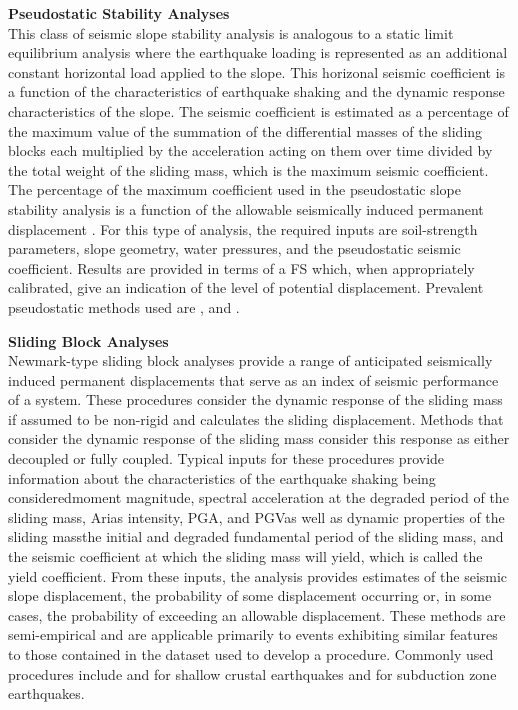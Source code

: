 \noindent\textbf{Pseudostatic Stability Analyses} \\
This class of seismic slope stability analysis is analogous to a static limit equilibrium analysis where the earthquake loading is represented as an additional constant horizontal load applied to the slope. This horizonal seismic coefficient is a function of the characteristics of earthquake shaking and the dynamic response characteristics of the slope. The seismic coefficient is estimated as a percentage of the maximum value of the summation of the differential masses of the sliding blocks each multiplied by the acceleration acting on them over time divided by the total weight of the sliding mass, which is the maximum seismic coefficient. The percentage of the maximum coefficient used in the pseudostatic slope stability analysis is a function of the allowable seismically induced permanent displacement \citep{bray2009pseudostatic}. For this type of analysis, the required inputs are soil-strength parameters, slope geometry, water pressures, and the pseudostatic seismic coefficient. Results are provided in terms of a FS which, when appropriately calibrated, give an indication of the level of potential displacement. Prevalent pseudostatic methods used are \cite{seed1979considerations, hynes1984rationalizing, bray2009pseudostatic, macedo2018performance}, and \cite{bray2019procedure}.
\newline

\noindent\textbf{Sliding Block Analyses} \\
Newmark-type sliding block analyses provide a range of anticipated seismically induced permanent displacements that serve as an index of seismic performance of a system. These procedures consider the dynamic response of the sliding mass if assumed to be non-rigid and calculates the sliding displacement. Methods that consider the dynamic response of the sliding mass consider this response as either decoupled or fully coupled. Typical inputs for these procedures provide information about the characteristics of the earthquake shaking being considered\textemdash moment magnitude, spectral acceleration at the degraded period of the sliding mass, Arias intensity, PGA, and PGV\textemdash as well as dynamic properties of the sliding mass\textemdash the initial and degraded fundamental period of the sliding mass, and the seismic coefficient at which the sliding mass will yield, which is called the yield coefficient. From these inputs, the analysis provides estimates of the seismic slope displacement, the probability of some displacement occurring or, in some cases, the probability of exceeding an allowable displacement. These methods are semi-empirical and are applicable primarily to events exhibiting similar features to those contained in the dataset used to develop a procedure. Commonly used procedures include \cite{makdisi1978simplified, jibson2007regression, bray2007simplified, saygili2008empirical, rathje2014probabilistic} and \cite{bray2019procedure} for shallow crustal earthquakes and \cite{bray2018simplified} for subduction zone earthquakes.
\newline

